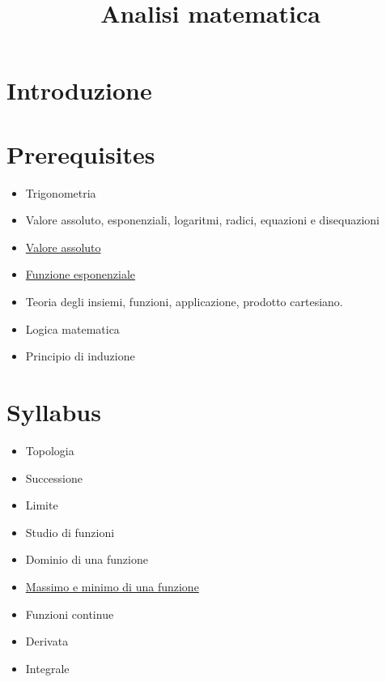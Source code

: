 \documentclass[a4paper,10pt]{article}
\title{Analisi matematica}
\author{}
\begin{document}
\maketitle


\section{Introduzione}

\section{Prerequisites}
\begin{itemize}
 \item Trigonometria
 \item Valore assoluto, esponenziali, logaritmi, radici, equazioni e disequazioni
 \item \href{./ValoreAssoluto.html}{Valore assoluto}
 \item \href{./FunzioneEsponenziale.html}{Funzione esponenziale}
 \item Teoria degli insiemi, funzioni, applicazione, prodotto cartesiano.
 \item Logica matematica
 \item Principio di induzione
\end{itemize}

\section{Syllabus}
\begin{itemize}
 \item Topologia
 \item Successione
 \item Limite
 \item Studio di funzioni
 \item Dominio di una funzione
 \item \href{FunzioneMassimoMinimo.html}{Massimo e minimo di una funzione}
 \item Funzioni continue
 \item Derivata
 \item Integrale
\end{itemize}
\end{document}
